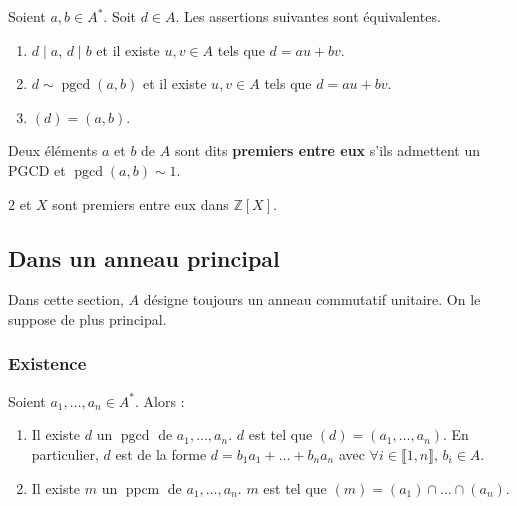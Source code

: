   \begin{proposition}
    Soient $a, b \in A^*$. Soit $d \in A$. Les assertions suivantes sont équivalentes.
    \begin{enumerate}[label={\bfseries(\roman*)}]
      \item $d \mid a$, $d \mid b$ et il existe $u, v \in A$ tels que $d = au + bv$.
      \item $d \sim \operatorname{pgcd}(a, b)$ et il existe $u, v \in A$ tels que $d = au + bv$.
      \item $(d) = (a,b)$.
    \end{enumerate}
  \end{proposition}

  \begin{definition}
    Deux éléments $a$ et $b$ de $A$ sont dits \textbf{premiers entre eux} s'ils admettent un PGCD et $\operatorname{pgcd}(a,b) \sim 1$.
  \end{definition}

  \begin{example}
    $2$ et $X$ sont premiers entre eux dans $\mathbb{Z}[X]$.
  \end{example}

  \subsection{Dans un anneau principal}

  Dans cette section, $A$ désigne toujours un anneau commutatif unitaire. On le suppose de plus principal.

  \subsubsection{Existence}

  \begin{theorem}
    Soient $a_1, \dots, a_n \in A^*$. Alors :
    \begin{enumerate}[label={\bfseries(\roman*)}]
      \item Il existe $d$ un $\operatorname{pgcd}$ de $a_1, \dots, a_n$. $d$ est tel que $(d) = (a_1, \dots, a_n)$. En particulier, $d$ est de la forme $d = b_1 a_1 + \dots + b_n a_n$ avec $\forall i \in \llbracket 1, n \rrbracket, \, b_i \in A$.
      \item Il existe $m$ un $\operatorname{ppcm}$ de $a_1, \dots, a_n$. $m$ est tel que $(m) = (a_1) \cap \dots \cap (a_n)$.
    \end{enumerate}
  \end{theorem}

